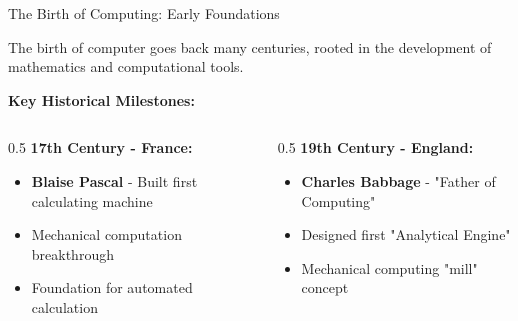 \documentclass[aspectratio=169]{beamer}
\begin{document}
\begin{frame}{The Birth of Computing: Early Foundations}
    \begin{definition}
        The birth of computer goes back many centuries, rooted in the development of mathematics and computational tools.
    \end{definition}
    
    \vspace{0.3cm}
    \textbf{Key Historical Milestones:}
    
    \begin{columns}
        \begin{column}{0.5\textwidth}
            \textbf{17th Century - France:}
            \begin{itemize}
                \item \textbf{Blaise Pascal} - Built first calculating machine
                \item Mechanical computation breakthrough
                \item Foundation for automated calculation
            \end{itemize} 
        \end{column} 

        \begin{column}{0.5\textwidth}
             \textbf{19th Century - England:}
            \begin{itemize}
                \item \textbf{Charles Babbage} - "Father of Computing"
                \item Designed first "Analytical Engine"
                \item Mechanical computing "mill" concept
            \end{itemize}
        \end{column}
    \end{columns}
\end{frame}
\end{document}
